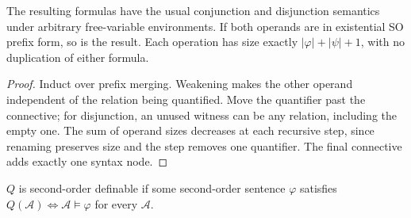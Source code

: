 \begin{theorem}
  \label{thm:desc-exist-so-connectives}
  \leanok
  The resulting formulas have the usual conjunction and disjunction semantics
  under arbitrary free-variable environments. If both operands are in
  existential SO prefix form, so is the result. Each operation has size exactly
  $|\varphi|+|\psi|+1$, with no duplication of either formula.
\end{theorem}
\begin{proof}
  \leanok
  Induct over prefix merging. Weakening makes the other operand independent of
  the relation being quantified. Move the quantifier past the connective; for
  disjunction, an unused witness can be any relation, including the empty one.
  The sum of operand sizes decreases at each recursive step, since renaming
  preserves size and the step removes one quantifier. The final connective adds
  exactly one syntax node.
\end{proof}

\begin{definition}
  \label{def:desc-so-definable}
  \leanok
  $Q$ is second-order definable if some second-order sentence $\varphi$ satisfies
  $Q(\mathcal{A}) \iff \mathcal{A} \models \varphi$ for every $\mathcal{A}$.
\end{definition}

